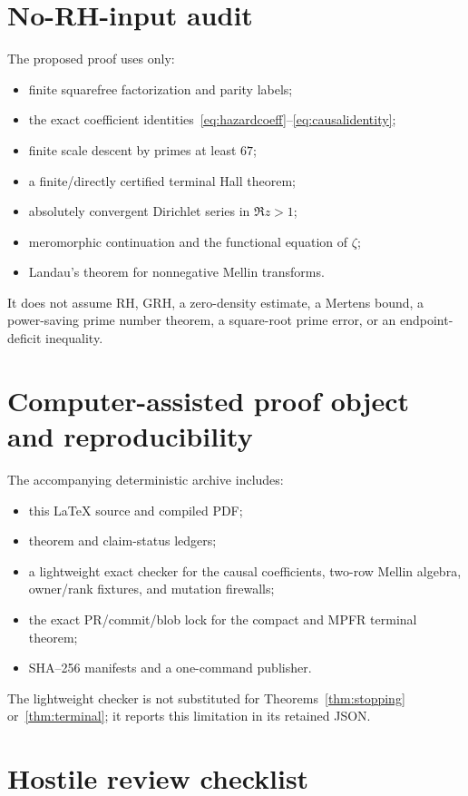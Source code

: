 \documentclass[11pt]{article}
\begin{document}
\section{No-RH-input audit}

The proposed proof uses only:
\begin{itemize}
\item finite squarefree factorization and parity labels;
\item the exact coefficient identities~\eqref{eq:hazardcoeff}--\eqref{eq:causalidentity};
\item finite scale descent by primes at least $67$;
\item a finite/directly certified terminal Hall theorem;
\item absolutely convergent Dirichlet series in $\Re z>1$;
\item meromorphic continuation and the functional equation of $\zeta$;
\item Landau's theorem for nonnegative Mellin transforms.
\end{itemize}
It does not assume RH, GRH, a zero-density estimate, a Mertens bound, a power-saving prime number theorem, a square-root prime error, or an endpoint-deficit inequality.

\section{Computer-assisted proof object and reproducibility}

The accompanying deterministic archive includes:
\begin{itemize}
\item this \LaTeX{} source and compiled PDF;
\item theorem and claim-status ledgers;
\item a lightweight exact checker for the causal coefficients, two-row Mellin algebra, owner/rank fixtures, and mutation firewalls;
\item the exact PR/commit/blob lock for the compact and MPFR terminal theorem;
\item SHA--256 manifests and a one-command publisher.
\end{itemize}
The lightweight checker is not substituted for Theorems~\ref{thm:stopping} or~\ref{thm:terminal}; it reports this limitation in its retained JSON.

\section{Hostile review checklist}
\end{document}
